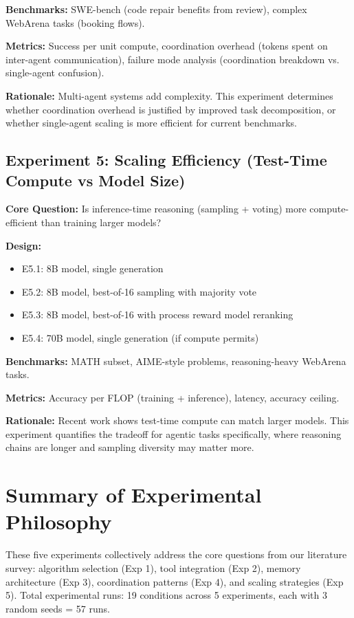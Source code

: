 \documentclass[12pt,a4paper]{report}
\theoremstyle{definition}
\begin{document}
\textbf{Benchmarks:} SWE-bench (code repair benefits from review), complex WebArena tasks (booking flows).

\textbf{Metrics:} Success per unit compute, coordination overhead (tokens spent on inter-agent communication), failure mode analysis (coordination breakdown vs. single-agent confusion).

\textbf{Rationale:} Multi-agent systems add complexity. This experiment determines whether coordination overhead is justified by improved task decomposition, or whether single-agent scaling is more efficient for current benchmarks.

\subsection{Experiment 5: Scaling Efficiency (Test-Time Compute vs Model Size)}
\textbf{Core Question:} Is inference-time reasoning (sampling + voting) more compute-efficient than training larger models?

\textbf{Design:}
\begin{itemize}
    \item E5.1: 8B model, single generation
    \item E5.2: 8B model, best-of-16 sampling with majority vote
    \item E5.3: 8B model, best-of-16 with process reward model reranking
    \item E5.4: 70B model, single generation (if compute permits)
\end{itemize}

\textbf{Benchmarks:} MATH subset, AIME-style problems, reasoning-heavy WebArena tasks.

\textbf{Metrics:} Accuracy per FLOP (training + inference), latency, accuracy ceiling.

\textbf{Rationale:} Recent work \cite{snell2024scaling} shows test-time compute can match larger models. This experiment quantifies the tradeoff for agentic tasks specifically, where reasoning chains are longer and sampling diversity may matter more.

\section*{Summary of Experimental Philosophy}

These five experiments collectively address the core questions from our literature survey: algorithm selection (Exp 1), tool integration (Exp 2), memory architecture (Exp 3), coordination patterns (Exp 4), and scaling strategies (Exp 5). Total experimental runs: 19 conditions across 5 experiments, each with 3 random seeds = 57 runs.
\end{document}
